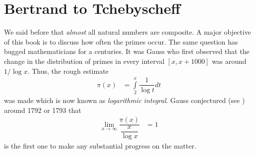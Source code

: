 \documentclass[elemannt.tex]{subfile}
\begin{document}
	\chapter{Bertrand to Tchebyscheff}
	We said before that \textit{almost} all natural numbers are composite. A major objective of this book is to discuss how often the primes occur. The same question has bugged mathematicians for a centuries. It was Gauss who first observed that the change in the distribution of primes in every interval $[x,x+1000]$ was around $1/\log{x}$. Thus, the rough estimate
		\begin{align*}
			\pi(x)
				& = \int\limits_{2}^{x}\dfrac{1}{\log{t}}dt
		\end{align*}
	was made which is now known as \textit{logarithmic integral}. Gauss conjectured (see \textcite[Page 37]{landau_1911}) around 1792 or 1793 that
		\begin{align*}
			\lim\limits_{x\to\infty}\dfrac{\pi(x)}{\dfrac{x}{\log{x}}}
				& = 1
		\end{align*}
	\textcite{Tchebyscheff_1852} is the first one to make any substantial progress on the matter. %
\end{document}
